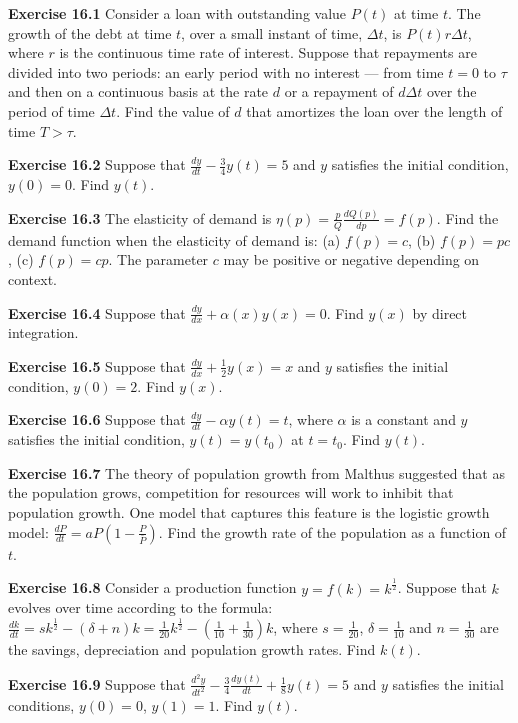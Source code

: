 \begin{original}
\textbf{Exercise 16.1} Consider a loan with outstanding value $P(t)$ at time $t$. The growth of the debt at time $t$, over a small instant of time, $\Delta t$, is $P(t)r\Delta t$, where $r$ is the continuous time rate of interest. Suppose that repayments are divided into two periods: an early period with no interest --- from time $t = 0$ to $\tau$ and then on a continuous basis at the rate $d$ or a repayment of $d\Delta t$ over the period of time $\Delta t$. Find the value of $d$ that amortizes the loan over the length of time $T > \tau$.

\textbf{Exercise 16.2} Suppose that $\frac{dy}{dt} - \frac{3}{4}y(t) = 5$ and $y$ satisfies the initial condition, $y(0) = 0$. Find $y(t)$.

\textbf{Exercise 16.3} The elasticity of demand is $\eta(p) = \frac{p}{Q}\frac{dQ(p)}{dp} = f(p)$. Find the demand function when the elasticity of demand is: (a) $f(p) = c$, (b) $f(p) = pc$, (c) $f(p) = cp$. The parameter $c$ may be positive or negative depending on context.

\textbf{Exercise 16.4} Suppose that $\frac{dy}{dx} + \alpha(x)y(x) = 0$. Find $y(x)$ by direct integration.

\textbf{Exercise 16.5} Suppose that $\frac{dy}{dx} + \frac{1}{2}y(x) = x$ and $y$ satisfies the initial condition, $y(0) = 2$. Find $y(x)$.

\textbf{Exercise 16.6} Suppose that $\frac{dy}{dt} - \alpha y(t) = t$, where $\alpha$ is a constant and $y$ satisfies the initial condition, $y(t) = y(t_0)$ at $t = t_0$. Find $y(t)$.

\textbf{Exercise 16.7} The theory of population growth from Malthus suggested that as the population grows, competition for resources will work to inhibit that population growth. One model that captures this feature is the logistic growth model: $\frac{dP}{dt} = aP\left(1 - \frac{P}{\bar{P}}\right)$. Find the growth rate of the population as a function of $t$.

\textbf{Exercise 16.8} Consider a production function $y = f(k) = k^{\frac{1}{2}}$. Suppose that $k$ evolves over time according to the formula: $\frac{dk}{dt} = sk^{\frac{1}{2}} - (\delta + n)k = \frac{1}{20}k^{\frac{1}{2}} - \left(\frac{1}{10} + \frac{1}{30}\right)k$, where $s = \frac{1}{20}$, $\delta = \frac{1}{10}$ and $n = \frac{1}{30}$ are the savings, depreciation and population growth rates. Find $k(t)$.

\textbf{Exercise 16.9} Suppose that $\frac{d^2 y}{dt^2} - \frac{3}{4}\frac{d y(t)}{dt} + \frac{1}{8}y(t) = 5$ and $y$ satisfies the initial conditions, $y(0) = 0$, $y(1) = 1$. Find $y(t)$.


\end{original}

